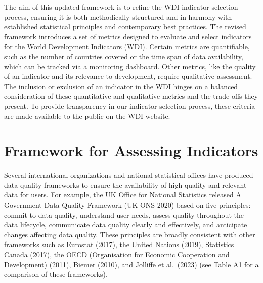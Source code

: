 \documentclass[
  11pt,
  a4paper,
  DIV=11,
  numbers=noendperiod]{scrreprt}
\begin{document}
The aim of this updated framework is to refine the WDI indicator
selection process, ensuring it is both methodically structured and in
harmony with established statistical principles and contemporary best
practices. The revised framework introduces a set of metrics designed to
evaluate and select indicators for the World Development Indicators
(WDI). Certain metrics are quantifiable, such as the number of countries
covered or the time span of data availability, which can be tracked via
a monitoring dashboard. Other metrics, like the quality of an indicator
and its relevance to development, require qualitative assessment. The
inclusion or exclusion of an indicator in the WDI hinges on a balanced
consideration of these quantitative and qualitative metrics and the
trade-offs they present. To provide transparency in our indicator
selection process, these criteria are made available to the public on
the WDI website.


\chapter{Framework for Assessing
Indicators}\label{framework-for-assessing-indicators}

Several international organizations and national statistical offices
have produced data quality frameworks to ensure the availability of
high-quality and relevant data for users. For example, the UK Office for
National Statistics released A Government Data Quality Framework (UK ONS
2020) based on five principles: commit to data quality, understand user
needs, assess quality throughout the data lifecycle, communicate data
quality clearly and effectively, and anticipate changes affecting data
quality. These principles are broadly consistent with other frameworks
such as Eurostat (2017), the United Nations (2019), Statistics Canada
(2017), the OECD (Organisation for Economic Cooperation and Development)
(2011), Biemer (2010), and Jolliffe et al.~(2023) (see Table A1 for a
comparison of these frameworks).
\end{document}
